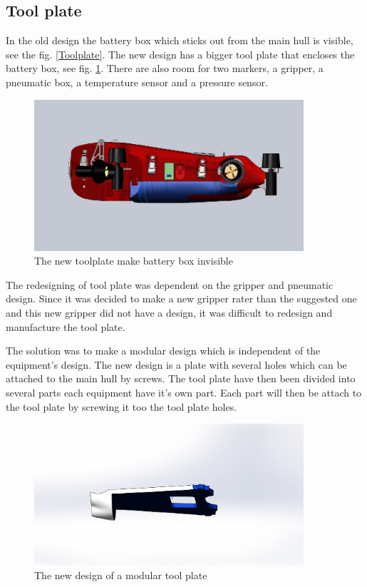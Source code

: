 \subsection{Tool plate} %

In the old design the battery box which sticks out from the main hull is visible, see the fig. \ref{Toolplate}. The new design has a bigger tool plate that encloses the battery box, see fig. \ref{toolplate2}. There are also room for two markers, a gripper, a pneumatic box, a temperature sensor and a pressure sensor.

	\begin{figure}[!ht]
	\begin{center}
		\includegraphics[width=100mm]{./Images/Mechanics/Naiadassembly2.JPG}
		\caption{The new toolplate make battery box invisible}
		\label{toolplate2}
	\end{center}
\end{figure}

The redesigning of tool plate was dependent on the gripper and pneumatic design. Since it was decided to make a new gripper rater than the suggested one and this new gripper did not have a design, it was difficult to redesign and manufacture the tool plate.

The solution was to make a modular design which is independent of the equipment's design. The new design is a plate with several holes which can be attached to the main hull by screws. The tool plate have then been divided into several parts each equipment have it's own part. Each part will then be attach to the tool plate by screwing it too the tool plate holes.  

	\begin{figure}[!ht]
	\begin{center}
		\includegraphics[width=100mm]{./Images/Mechanics/PlateTool.JPG}
		\caption{The new design of a modular tool plate}
		\label{hyrdrobox}
	\end{center}
	\end{figure}
	
